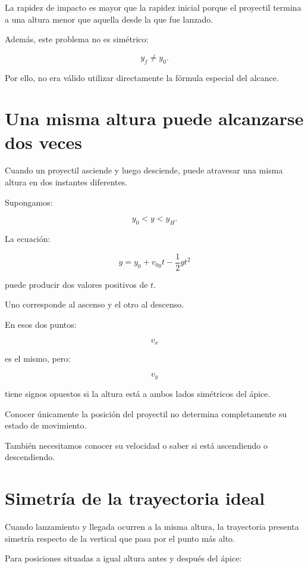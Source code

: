\begin{interpretacion}
La rapidez de impacto es mayor que la rapidez inicial porque el proyectil termina
a una altura menor que aquella desde la que fue lanzado.

Además, este problema no es simétrico:

\[
y_f\neq y_0.
\]

Por ello, no era válido utilizar directamente la fórmula especial del alcance.
\end{interpretacion}


\section{Una misma altura puede alcanzarse dos veces}

Cuando un proyectil asciende y luego desciende, puede atravesar una misma altura
en dos instantes diferentes.

Supongamos:

\[
y_0<y<y_H.
\]

La ecuación:

\[
y
=
y_0
+
v_{0y}t
-
\frac{1}{2}gt^2
\]

puede producir dos valores positivos de \(t\).

Uno corresponde al ascenso y el otro al descenso.

En esos dos puntos:

\[
v_x
\]

es el mismo, pero:

\[
v_y
\]

tiene signos opuestos si la altura está a ambos lados simétricos del ápice.

\begin{interpretacion}
Conocer únicamente la posición del proyectil no determina completamente su
estado de movimiento.

También necesitamos conocer su velocidad o saber si está ascendiendo o
descendiendo.
\end{interpretacion}


\section{Simetría de la trayectoria ideal}

Cuando lanzamiento y llegada ocurren a la misma altura, la trayectoria presenta
simetría respecto de la vertical que pasa por el punto más alto.

Para posiciones situadas a igual altura antes y después del ápice:

